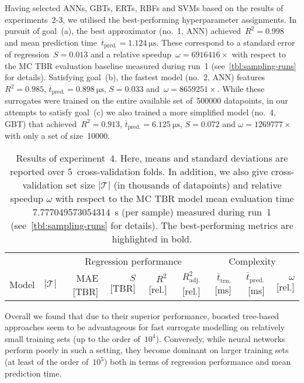 Having selected ANNs, GBTs, ERTs, RBFs and SVMs based on the results of
experiments~2-3, we utilised the best-performing hyperparameter
assignments. In pursuit of goal~(a), the best approximator (no.~1,
ANN) achieved~$R^2=\num{0.998}$ and mean prediction
time~$\overline{t}_{\text{pred.}}=\SI{1.124}{\micro\second}$. These correspond
to a standard error of regression~$S=\num{0.013}$ and a relative speedup~$\omega=\num{6916416} \times$
with respect to the MC TBR evaluation baseline measured during run~1
(see~\cref{tbl:sampling-runs} for details). Satisfying
goal~(b), the fastest model (no.~2, ANN) features~$R^2=\num{0.985}$,
$\overline{t}_{\text{pred.}}=\SI{0.898}{\micro\second}$, $S=\num{0.033}$
and~$\omega=\num{8659251} \times$.
While these surrogates
were trained on the entire available set of~\num{500000} datapoints, in our
attempts to satisfy goal~(c) we also trained a more simplified model (no.~4, GBT)
that achieved~$R^2=\num{0.913}$,
$\overline{t}_{\text{pred.}}=\SI{6.125}{\micro\second}$, $S=\num{0.072}$ and $\omega=\num{1269777} \times$
with only a set of size~\num{10000}.

\begin{table}[h]
	\centering
	\setlength\tabcolsep{2pt}
	{\scriptsize
		\begin{tabular}{lrrrrrrrr}
		\toprule
		{} & {} & \multicolumn{4}{c}{Regression performance} &
		\multicolumn{3}{c}{Complexity}\\
		\cmidrule(lr){3-6}
		\cmidrule(lr){7-9}
		Model & $|\mathcal{T}|$ & MAE [TBR] & $S$ [TBR] & $R^2$ [rel.] & $R^2_{\text{adj.}}$ [rel.]
						& $\overline{t}_{\text{trn.}}$ [\si{\milli\second}] &
		$\overline{t}_{\text{pred.}}$ [\si{\milli\second}] & $\omega$ [rel.]\\
		\midrule
		
		\bottomrule
		\end{tabular}
	}
	\caption{Results of experiment~4. Here, means and
		standard deviations are reported over 5~cross-validation folds. In addition, we also give
		cross-validation set size $|\mathcal{T}|$ (in thousands of datapoints)
		and relative speedup $\omega$ with respect to the
		MC TBR model mean evaluation time \SI{7.777049573054314}{\second} (per
		sample) measured during run~1 (see~\cref{tbl:sampling-runs} for details).
		The best-performing metrics are highlighted in bold.}
	\label{tbl:exp4-detailed-results}
\end{table}

Overall we found that due to their superior performance, boosted tree-based
approaches seem to be advantageous for fast surrogate modelling on relatively small training
sets (up to the order of~$10^4$). Conversely, while neural networks perform
poorly in such a setting, they become dominant on larger training
sets (at least of the order of~$10^5$) both in terms of regression performance
and mean prediction time.

